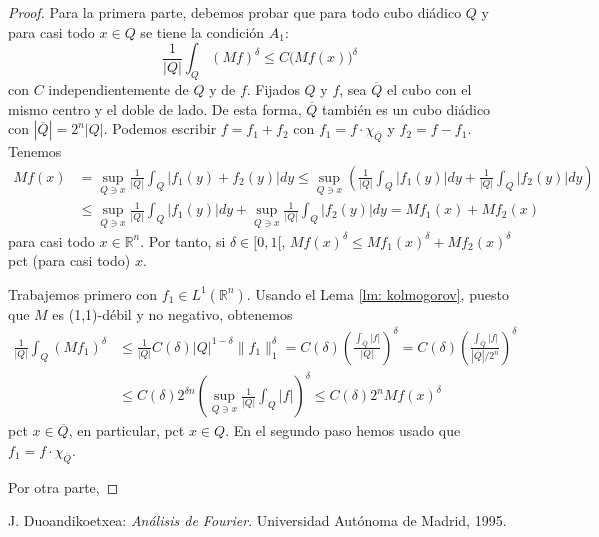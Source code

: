 \documentclass[12pt,english]{article}
\theoremstyle{definition}
\theoremstyle{remark}
\begin{document}
\begin{proof}
	Para la primera parte, debemos probar que para todo cubo diádico $Q$ y para casi todo $x\in Q$ se tiene la condición $A_1$:
	\[\frac{1}{|Q|}\int_Q(Mf)^\delta\leq C\big(Mf(x)\big)^\delta\]
	con $C$ independientemente de $Q$ y de $f$. Fijados $Q$ y $f$, sea $\overline{Q}$ el cubo con el mismo centro y el doble de lado. De esta forma, $\overline{Q}$ también es un cubo diádico con $|\overline{Q}|=2^n|Q|$. Podemos escribir $f=f_1+f_2$ con $f_1=f\cdot\chi_{\overline{Q}}$ y $f_2=f-f_1$. Tenemos
	\begin{align*}
	Mf(x)&=\sup_{Q\ni x}\frac{1}{|Q|}\int_Q|f_1(y)+f_2(y)|dy\leq\sup_{Q\ni x}\left(\frac{1}{|Q|}\int_Q|f_1(y)|dy+\frac{1}{|Q|}\int_Q|f_2(y)|dy\right) \\
	&\leq\sup_{Q\ni x}\frac{1}{|Q|}\int_Q|f_1(y)|dy+\sup_{Q\ni x}\frac{1}{|Q|}\int_Q|f_2(y)|dy=Mf_1(x)+Mf_2(x)
	\end{align*}
	para casi todo $x\in\mathbb{R}^n$. Por tanto, si $\delta\in [0,1[$, $Mf(x)^\delta\leq Mf_1(x)^\delta+Mf_2(x)^\delta$ pct (para casi todo) $x$.
	
	Trabajemos primero con $f_1\in L^1(\mathbb{R}^n)$. Usando el Lema \ref{lm: kolmogorov}, puesto que $M$ es (1,1)-débil y no negativo, obtenemos
	\begin{equation} \label{eq: cota int Mf1}
	\begin{split}
		\frac{1}{|Q|}\int_Q(Mf_1)^\delta &\leq\frac{1}{|Q|} C(\delta)|Q|^{1-\delta}\|f_1\|_1^\delta=C(\delta)\left(\frac{\int_{\overline{Q}}|f|}{|Q|}\right)^\delta =C(\delta)\left(\frac{\int_{\overline{Q}}|f|}{|\overline{Q}|/2^n}\right)^\delta \\ &\leq C(\delta)2^{\delta n} \left(\sup_{Q\ni x}\frac{1}{|Q|}\int_Q|f|\right)^\delta\leq C(\delta)2^{n} Mf(x)^\delta
	\end{split}
	\end{equation}
	pct $x\in\overline{Q}$, en particular, pct $x\in Q$. En el segundo paso hemos usado que $f_1=f\cdot\chi_{\overline{Q}}$.
	
	Por otra parte,
\end{proof}

\begin{thebibliography}{99}
 J. Duoandikoetxea: \emph{Análisis de Fourier}. Universidad Autónoma de Madrid, 1995.
\end{thebibliography}
\end{document}
